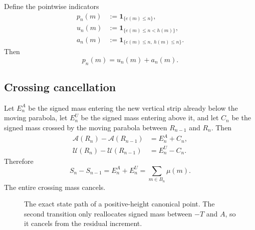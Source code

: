 \documentclass[11pt]{article}
\theoremstyle{definition}
\theoremstyle{remark}
\newcommand{\1}{\mathbf{1}}
\begin{document}
Define the pointwise indicators
\begin{align}
 p_n(m)&:=\1_{\{e(m)\le n\}},
 \label{eq:p-indicator}\\
 u_n(m)&:=\1_{\{e(m)\le n<h(m)\}},
 \label{eq:u-indicator}\\
 a_n(m)&:=\1_{\{e(m)\le n,\ h(m)\le n\}}.
 \label{eq:a-indicator}
\end{align}
Then
\begin{equation}
 \boxed{p_n(m)=u_n(m)+a_n(m).}
 \label{eq:temporal-partition}
\end{equation}

\subsection{Crossing cancellation}

Let $E_n^A$ be the signed mass entering the new vertical strip already below the moving parabola, let $E_n^U$ be the signed mass entering above it, and let $C_n$ be the signed mass crossed by the moving parabola between $R_{n-1}$ and $R_n$.  Then
\begin{align}
 \mathcal A(R_n)-\mathcal A(R_{n-1})
 &=E_n^A+C_n,
 \label{eq:Delta-A}\\
 \mathcal U(R_n)-\mathcal U(R_{n-1})
 &=E_n^U-C_n.
 \label{eq:Delta-U}
\end{align}
Therefore
\begin{equation}
 \boxed{
 S_n-S_{n-1}
 =E_n^A+E_n^U
 =\sum_{m\in B_n}\mu(m).
 }
 \label{eq:Delta-S}
\end{equation}
The entire crossing mass cancels.

\begin{figure}[htbp]
\centering
{}
\caption{The exact state path of a positive-height canonical point.  The second transition only reallocates signed mass between $-T$ and $A$, so it cancels from the residual increment.}
\label{fig:state-path}
\end{figure}
\end{document}
